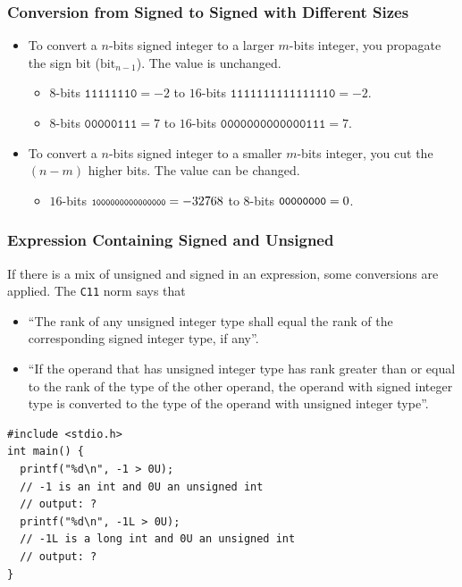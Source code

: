 \documentclass{beamer}
\begin{document}
\begin{frame}%
\frametitle{Conversion from Signed to Signed with Different Sizes}

\begin{itemize}

\item To convert a $n$-bits signed integer to a larger $m$-bits integer, you
  propagate the sign bit ($\textrm{bit}_{n-1}$). The value is unchanged.
  \begin{itemize}
  \item $8$-bits $\texttt{11111110} = -2$ to $16$-bits $\texttt{1111111111111110} = -2$.
  \item $8$-bits $\texttt{00000111} = 7$ to $16$-bits $\texttt{0000000000000111} = 7$.
  \end{itemize}

\vspace{0.5cm}

\item To convert a $n$-bits signed integer to a smaller $m$-bits integer, you
  cut the $(n - m)$ higher bits. The value can be changed.
  \begin{itemize}
  \item $16$-bits $\scriptsize{\texttt{1000000000000000}} = -32768$ to $8$-bits $\small{\texttt{00000000}} = 0$.
  \end{itemize}

\end{itemize}

\end{frame}

\begin{frame}[fragile]
\frametitle{Expression Containing Signed and Unsigned}

\scriptsize

If there is a mix of unsigned and signed in an expression, some conversions are applied. The \texttt{C11} norm says that
\begin{itemize}

\item ``The rank of any unsigned integer type shall equal the rank of the corresponding signed integer type, if any''.

\vspace{0.2cm}

\item ``If the operand that has unsigned integer type has rank greater than or equal to the rank of the type of the other operand, the operand with signed integer type is converted to the type of the operand with unsigned integer type''.

\end{itemize}

\vspace{0.2cm}

\begin{lstlisting}
#include <stdio.h>
int main() {
  printf("%d\n", -1 > 0U);
  // -1 is an int and 0U an unsigned int
  // output: ?
  printf("%d\n", -1L > 0U);
  // -1L is a long int and 0U an unsigned int
  // output: ?
}
\end{lstlisting}

\end{frame}
\end{document}
